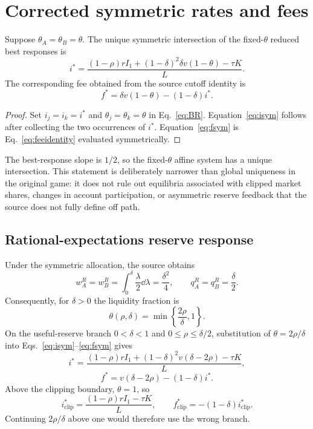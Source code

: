 \section{Corrected symmetric rates and fees}
\begin{proposition}\label{prop:sym}
Suppose $\theta_A=\theta_B=\theta$. The unique symmetric intersection of the fixed-$\theta$ reduced best responses is
\begin{equation}\label{eq:isym}
\boxed{
 i^*=\frac{(1-\rho)rI_1+(1-\delta)^2\delta v(1-\theta)-\tau K}{L}.}
\end{equation}
The corresponding fee obtained from the source cutoff identity is
\begin{equation}\label{eq:fsym}
\boxed{f^*=\delta v(1-\theta)-(1-\delta)i^*.}
\end{equation}
\end{proposition}

\begin{proof}
Set $i_j=i_k=i^*$ and $\theta_j=\theta_k=\theta$ in Eq.~\eqref{eq:BR}. Equation~\eqref{eq:isym} follows after collecting the two occurrences of $i^*$. Equation~\eqref{eq:fsym} is Eq.~\eqref{eq:feeidentity} evaluated symmetrically.
\end{proof}

The best-response slope is $1/2$, so the fixed-$\theta$ affine system has a unique intersection. This statement is deliberately narrower than global uniqueness in the original game: it does not rule out equilibria associated with clipped market shares, changes in account participation, or asymmetric reserve feedback that the source does not fully define off path.

\subsection{Rational-expectations reserve response}
Under the symmetric allocation, the source obtains
\[
 w_A^R=w_B^R=\int_0^\delta \frac{\lambda}{2}\dd\lambda=\frac{\delta^2}{4},
 \qquad q_A^R=q_B^R=\frac{\delta}{2}.
\]
Consequently, for $\delta>0$ the liquidity fraction is
\begin{equation}\label{eq:theta}
\theta(\rho,\delta)=\min\left\{\frac{2\rho}{\delta},1\right\}.
\end{equation}
On the useful-reserve branch $0<\delta<1$ and $0\le\rho\le\delta/2$, substitution of $\theta=2\rho/\delta$ into Eqs.~\eqref{eq:isym}--\eqref{eq:fsym} gives
\begin{equation}\label{eq:iuseful}
 i^*=\frac{(1-\rho)rI_1+(1-\delta)^2v(\delta-2\rho)-\tau K}{L},
\end{equation}
\begin{equation}\label{eq:fuseful}
 f^*=v(\delta-2\rho)-(1-\delta)i^*.
\end{equation}
Above the clipping boundary, $\theta=1$, so
\begin{equation}\label{eq:iclipped}
 i^*_{\mathrm{clip}}=\frac{(1-\rho)rI_1-\tau K}{L},\qquad
 f^*_{\mathrm{clip}}=-(1-\delta)i^*_{\mathrm{clip}}.
\end{equation}
Continuing $2\rho/\delta$ above one would therefore use the wrong branch.
